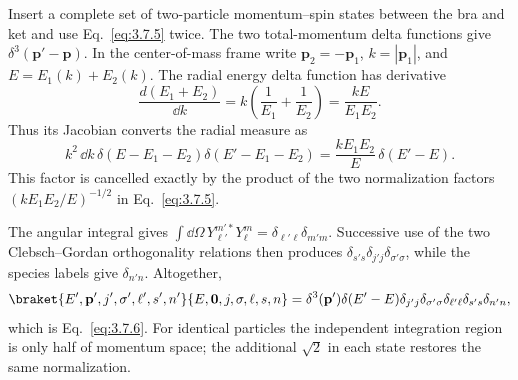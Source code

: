 \begin{enumerate}
Insert a complete set of two-particle momentum--spin states between the
bra and ket and use Eq.~\eqref{eq:3.7.5} twice.  The two total-momentum
delta functions give
\(\delta^3(\mathbf p'-\mathbf p)\).  In the center-of-mass frame write
\(\mathbf p_2=-\mathbf p_1\), \(k=|\mathbf p_1|\), and
\(E=E_1(k)+E_2(k)\).  The radial energy delta function has derivative
\[
 \frac{d(E_1+E_2)}{\dd k}
 =k\left(\frac1{E_1}+\frac1{E_2}\right)
 =\frac{kE}{E_1E_2}.
\]
Thus its Jacobian converts the radial measure as
\[
 k^2\,\dd k\,
 \delta(E-E_1-E_2)\delta(E'-E_1-E_2)
 =\frac{kE_1E_2}{E}\,\delta(E'-E).
\]
This factor is cancelled exactly by the product of the two normalization
factors \((kE_1E_2/E)^{-1/2}\) in Eq.~\eqref{eq:3.7.5}.

The angular integral gives
\(\int \dd\Omega\,Y_{\ell'}^{m'*}Y_\ell^m
=\delta_{\ell'\ell}\delta_{m'm}\).  Successive use of the two
Clebsch--Gordan orthogonality relations then produces
\(\delta_{s's}\delta_{j'j}\delta_{\sigma'\sigma}\), while the species
labels give \(\delta_{n'n}\).  Altogether,
\[
 \braket{E',\mathbf p',j',\sigma',\ell',s',n'}
 {E,\mathbf0,j,\sigma,\ell,s,n}
 =\delta^3(\mathbf p')\delta(E'-E)
 \delta_{j'j}\delta_{\sigma'\sigma}
 \delta_{\ell'\ell}\delta_{s's}\delta_{n'n},
\]
which is Eq.~\eqref{eq:3.7.6}.  For identical particles the independent
integration region is only half of momentum space; the additional
\(\sqrt2\) in each state restores the same normalization.
\end{enumerate}

